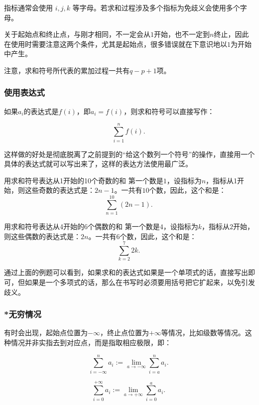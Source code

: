 指标通常会使用 $i,j,k$ 等字母。若求和过程涉及多个指标为免歧义会使用多个字母。

关于起始点和终止点，与刚才相同，不一定会从$1$开始，也不一定到$n$终止，因此在使用时需要注意这两个条件，尤其是起始点，很多错误就在下意识地以$1$为开始中产生。

注意，求和符号所代表的累加过程一共有$q-p+1$项。

\subsubsection{使用表达式}

如果$a_i$的表达式是$f(i)$，即$a_i=f(i)$，则求和符号可以直接写作：

\begin{equation}
\sum_{i=1}^n f(i) .~
\end{equation}

这样做的好处是彻底脱离了之前提到的“给这个数列一个符号”的操作，直接用一个具体的表达式就可以写出来了，这样的表达方法使用最广泛。

\begin{example}{用求和符号表达从1开始的10个奇数的和}
第一个数是$1$，设指标为$n$，指标从1开始，则这些奇数的表达式是：$2n-1$。一共有$10$个数，因此，这个和是：
$$\sum_{n=1}^{10}(2n-1).~$$
\end{example}

\begin{example}{用求和符号表达从4开始的6个偶数的和}
第一个数是$4$，设指标为$k$，指标从$2$开始，则这些偶数的表达式是：$2n$。一共有$6$个数，因此，这个和是：
$$\sum_{k=2}^{7}{2k} .~$$
\end{example}

通过上面的例题可以看到，如果求和的表达式如果是一个单项式的话，直接写出即可，但如果是一个多项式的话，那么在书写时必须要用括号把它扩起来，以免引发歧义。

\subsubsection{*无穷情况}

有时会出现，起始点位置为$-\infty$，终止点位置为$+\infty$等情况，比如级数等情况。这种情况并非实指去到对应点，而是指取相应极限，即：

\begin{equation}
\sum_{i=-\infty}^n a_i:= \lim_{a\to-\infty}\sum_{i=a}^n a_i.~
\end{equation}

\begin{equation}
\sum_{i=0}^{+\infty} a_i:= \lim_{a\to+\infty}\sum_{i=0}^a a_i.~
\end{equation}

